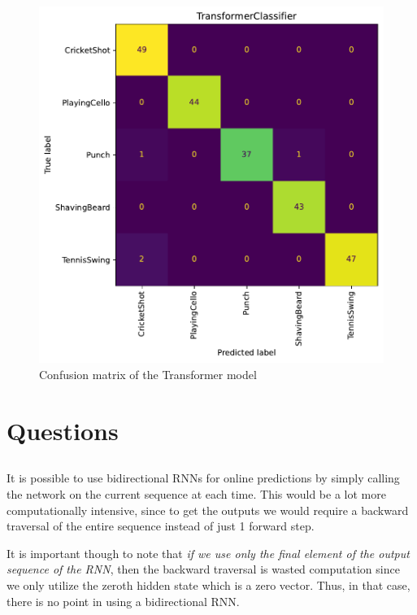 \documentclass{article}
\begin{document}
\begin{figure}[h]
    \label{fig:confmat_transformer}
    \centering
    \includegraphics[scale=0.5]{./confusion_matrix_transformer.pdf}
    \caption{Confusion matrix of the Transformer model}
\end{figure}

\section{Questions}

\subsection{}

It is possible to use bidirectional RNNs for online predictions by simply calling the network on the current sequence at each time. This would be a lot more computationally intensive, since to get the outputs we would require a backward traversal of the entire sequence instead of just 1 forward step.

It is important though to note that \emph{if we use only the final element of the output sequence of the RNN}, then the backward traversal is wasted computation since we only utilize the zeroth hidden state which is a zero vector. Thus, in that case, there is no point in using a bidirectional RNN.
\end{document}
